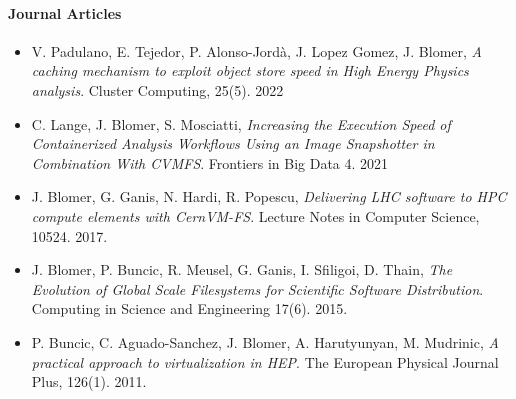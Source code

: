 \paragraph{Journal Articles}

\begin{itemize}

\item[] V. Padulano, E. Tejedor, P. Alonso-Jordà, J. Lopez Gomez, J. Blomer,
\emph{A caching mechanism to exploit object store speed in High Energy Physics analysis}.
Cluster Computing, 25(5). 2022

\item[] C. Lange, J. Blomer, S. Mosciatti, \emph{Increasing the Execution Speed of Containerized Analysis Workflows Using an Image
Snapshotter in Combination With CVMFS}. Frontiers in Big Data 4. 2021

\item[] J. Blomer, G. Ganis, N. Hardi, R. Popescu, \emph{Delivering LHC software to HPC compute elements with CernVM-FS}.
Lecture Notes in Computer Science, 10524. 2017.

\item[] J. Blomer, P. Buncic, R. Meusel, G. Ganis, I. Sfiligoi, D. Thain, \emph{The Evolution of Global Scale Filesystems for Scientific Software Distribution}.
Computing in Science and Engineering 17(6). 2015.

\item[] P. Buncic, C. Aguado-Sanchez, J. Blomer, A. Harutyunyan, M. Mudrinic,
\emph{A practical approach to virtualization in HEP}.
The European Physical Journal Plus, 126(1). 2011.

\end{itemize}
